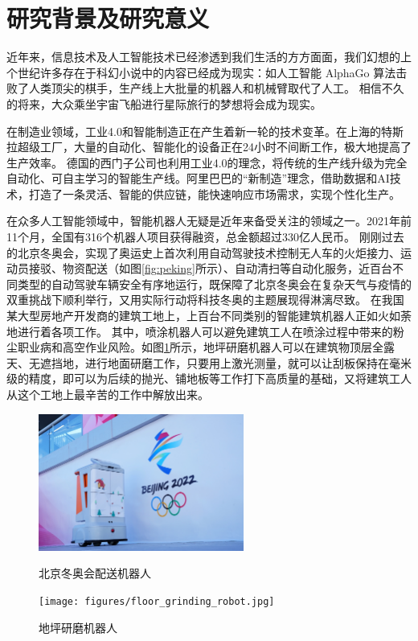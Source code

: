 \section{研究背景及研究意义}
\par 近年来，信息技术及人工智能技术已经渗透到我们生活的方方面面，我们幻想的上个世纪许多存在于科幻小说中的内容已经成为现实：如人工智能 AlphaGo 算法击败了人类顶尖的棋手，生产线上大批量的机器人和机械臂取代了人工。
相信不久的将来，大众乘坐宇宙飞船进行星际旅行的梦想将会成为现实。

\par 在制造业领域，工业4.0和智能制造正在产生着新一轮的技术变革。在上海的特斯拉超级工厂，大量的自动化、智能化的设备正在24小时不间断工作，极大地提高了生产效率。
德国的西门子公司也利用工业4.0的理念，将传统的生产线升级为完全自动化、可自主学习的智能生产线。阿里巴巴的“新制造”理念，借助数据和AI技术，打造了一条灵活、智能的供应链，能快速响应市场需求，实现个性化生产。

\par 在众多人工智能领域中，智能机器人无疑是近年来备受关注的领域之一。2021年前11个月，全国有316个机器人项目获得融资，总金额超过330亿人民币。
刚刚过去的北京冬奥会，实现了奥运史上首次利用自动驾驶技术控制无人车的火炬接力、运动员接驳、物资配送（如图\ref{fig:peking}所示）、自动清扫等自动化服务，近百台不同类型的自动驾驶车辆安全有序地运行，既保障了北京冬奥会在复杂天气与疫情的双重挑战下顺利举行，又用实际行动将科技冬奥的主题展现得淋漓尽致。
在我国某大型房地产开发商的建筑工地上\cite{jiqirenjianzhu_chuangxin,jiqirenjianzhu_hulian}，上百台不同类别的智能建筑机器人正如火如荼地进行着各项工作。
其中，喷涂机器人可以避免建筑工人在喷涂过程中带来的粉尘职业病和高空作业风险。如图\ref{fig:grinding}所示，地坪研磨机器人可以在建筑物顶层全露天、无遮挡地，进行地面研磨工作，只要用上激光测量，就可以让刮板保持在毫米级的精度，即可以为后续的抛光、铺地板等工作打下高质量的基础，又将建筑工人从这个工地上最辛苦的工作中解放出来。

\begin{figure}[htb]
	\centering
	\begin{minipage}[t]{0.45\linewidth}
		\centering
		\includegraphics[height=4.5cm,keepaspectratio]{figures/delivery_robot.jpg}
		\caption{北京冬奥会配送机器人}
		\label{fig:peking}
	\end{minipage}
	\begin{minipage}[t]{0.45\linewidth}
		\centering
		\texttt{[image: figures/floor\_grinding\_robot.jpg]}
		\caption{地坪研磨机器人}
		\label{fig:grinding}
	\end{minipage}
\end{figure}

